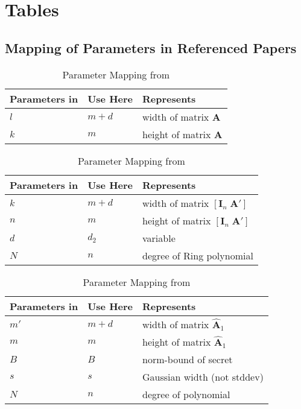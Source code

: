 \chapter{Tables}
\section{Mapping of Parameters in Referenced Papers}
\begin{table}
    \centering
    \begin{tabular}[h]{lll}
        \toprule
        Parameters in \cite{LPR13} & Use Here & Represents                    \\\hline
        $l$                        & $m+d$    & width of matrix $\mathbf{A}$  \\
        $k$                        & $m$      & height of matrix $\mathbf{A}$ \\
        \bottomrule
    \end{tabular}
    \caption{Parameter Mapping from \cite{LPR13}}\label{tab:mapping-LPR13}
    \vspace{1cm}
    \centering
    \begin{tabular}[h]{lll}
        \toprule
        Parameters in \cite{BDLOP18} & Use Here & Represents                                         \\\hline
        $k$                          & $m+d$    & width of matrix $[ \mathbf{I}_n \; \mathbf{A}' ]$  \\
        $n$                          & $m$      & height of matrix $[ \mathbf{I}_n \; \mathbf{A}' ]$ \\
        $d$                          & $d_2$    & variable                                           \\
        $N$                          & $n$      & degree of Ring polynomial                          \\
        \bottomrule
    \end{tabular}
    \caption{Parameter Mapping from \cite{BDLOP18}}\label{tab:mapping-BDLOP18}
    \vspace{1cm}
    \centering
    \begin{tabular}[h]{lll}
        \toprule
        Parameters in \cite{DOTT21} & Use Here & Represents                            \\\hline
        $m'$                        & $m+d$    & width of matrix $\hat{\mathbf{A}}_1$  \\
        $m$                         & $m$      & height of matrix $\hat{\mathbf{A}}_1$ \\
        $B$                         & $B$      & norm-bound of secret                  \\
        $s$                         & $s$      & Gaussian width (not stddev)           \\
        $N$                         & $n$      & degree of polynomial                  \\
        \bottomrule
    \end{tabular}
    \caption{Parameter Mapping from \cite{DOTT21}}\label{tab:mapping-DOTT21}
\end{table}
